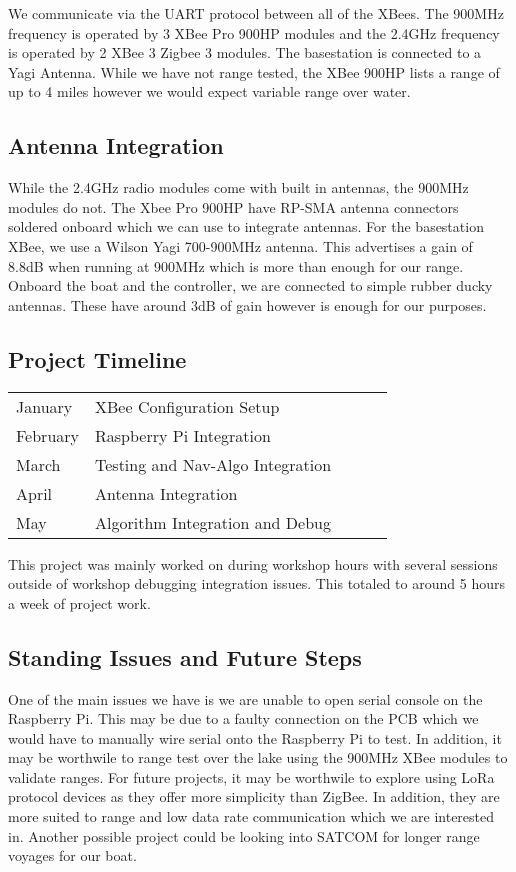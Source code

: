 \documentclass{article}
\begin{document}
\noindent We communicate via the UART protocol between all of the XBees. The 900MHz frequency is operated by 3 XBee Pro 900HP modules and the 2.4GHz frequency is operated by 2 XBee 3 Zigbee 3 modules. The basestation is connected to a Yagi Antenna. While we have not range tested, the XBee 900HP lists a range of up to 4 miles however we would expect variable range over water.

\subsection{Antenna Integration}
\noindent While the 2.4GHz radio modules come with built in antennas, the 900MHz modules do not. The Xbee Pro 900HP have RP-SMA antenna connectors soldered onboard which we can use to integrate antennas. For the basestation XBee, we use a Wilson Yagi 700-900MHz antenna. This advertises a gain of 8.8dB when running at 900MHz which is more than enough for our range. Onboard the boat and the controller, we are connected to simple rubber ducky antennas. These have around 3dB of gain however is enough for our purposes.

\subsection{Project Timeline}

\begin{table}[htp]
\begin{tabular}{l|l|lll}
January  & XBee Configuration Setup         &  &  &  \\
February & Raspberry Pi Integration         &  &  &  \\
March    & Testing and Nav-Algo Integration &  &  &  \\
April    & Antenna Integration              &  &  &  \\
May      & Algorithm Integration and Debug  &  &  & 
\end{tabular}
\end{table}

\noindent This project was mainly worked on during workshop hours with several sessions outside of workshop debugging integration issues. This totaled to around 5 hours a week of project work.


\subsection{Standing Issues and Future Steps}
One of the main issues we have is we are unable to open serial console on the Raspberry Pi. This may be due to a faulty connection on the PCB which we would have to manually wire serial onto the Raspberry Pi to test. In addition, it may be worthwile to range test over the lake using the 900MHz XBee modules to validate ranges. For future projects, it may be worthwile to explore using LoRa protocol devices as they offer more simplicity than ZigBee. In addition, they are more suited to range and low data rate communication which we are interested in. Another possible project could be looking into SATCOM for longer range voyages for our boat.
\end{document}
